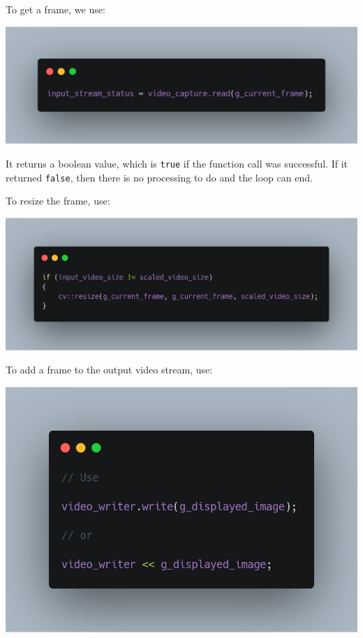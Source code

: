 \documentclass[english,a4paper,12pt,oneside]{article}
\begin{document}
To get a frame, we use:

\includegraphics[width=\linewidth]{carbon(10)}

It returns a boolean value, which is \verb+true+ if the function call was successful. 
If it returned \verb+false+, then there is no processing to do and the loop can end. 


To resize the frame, use:

\includegraphics[width=\linewidth]{carbon(11)}

To add a frame to the output video stream, use:


\begin{center}
\includegraphics[width=0.6\linewidth]{carbon(12)}
\end{center}
\end{document}
